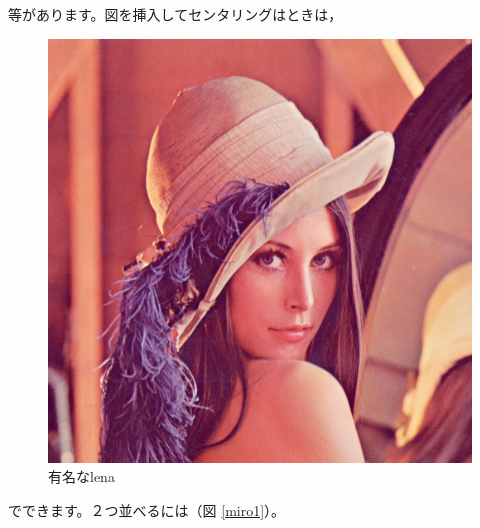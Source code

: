 \documentclass[xelatex,ja=standard,jafont=noto]{bxjsarticle}
\begin{document}
等があります。図を挿入してセンタリングはときは，
\begin{figure}[h] %
    \centering
    \includegraphics[scale=0.3]{lena}
    \caption{有名なlena}
    \label{lena}
\end{figure}

でできます。２つ並べるには（図 \ref{miro1}）。
\end{document}
